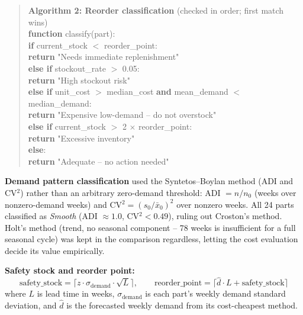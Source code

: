 \documentclass[12pt]{article}
\begin{document}
\begin{quote}
\footnotesize\ttfamily\noindent
\textbf{Algorithm 2: Reorder classification} (checked in order; first match wins)\\[0.3em]
\textbf{function} classify(part):\\
\hspace*{1.5em}\textbf{if} current\_stock $<$ reorder\_point:\\
\hspace*{3em}\textbf{return} "Needs immediate replenishment"\\
\hspace*{1.5em}\textbf{else if} stockout\_rate $>$ 0.05:\\
\hspace*{3em}\textbf{return} "High stockout risk"\\
\hspace*{1.5em}\textbf{else if} unit\_cost $>$ median\_cost \textbf{and} mean\_demand $<$ median\_demand:\\
\hspace*{3em}\textbf{return} "Expensive low-demand -- do not overstock"\\
\hspace*{1.5em}\textbf{else if} current\_stock $>$ 2 $\times$ reorder\_point:\\
\hspace*{3em}\textbf{return} "Excessive inventory"\\
\hspace*{1.5em}\textbf{else}:\\
\hspace*{3em}\textbf{return} "Adequate -- no action needed"
\end{quote}

\textbf{Demand pattern classification} used the Syntetos--Boylan method (ADI and CV$^2$)
rather than an arbitrary zero-demand threshold: ADI $= n / n_0$ (weeks over nonzero-demand
weeks) and CV$^2 = (s_0/\bar{x}_0)^2$ over nonzero weeks. All 24 parts classified as
\emph{Smooth} (ADI $\approx 1.0$, CV$^2 < 0.49$), ruling out Croston's method. Holt's method
(trend, no seasonal component -- 78 weeks is insufficient for a full seasonal cycle) was kept
in the comparison regardless, letting the cost evaluation decide its value empirically.

\textbf{Safety stock and reorder point:}
\[
\text{safety\_stock} = \lceil z \cdot \sigma_{\text{demand}} \cdot \sqrt{L} \rceil, \qquad
\text{reorder\_point} = \lceil \hat{d} \cdot L + \text{safety\_stock} \rceil
\]
where $L$ is lead time in weeks, $\sigma_{\text{demand}}$ is each part's weekly demand
standard deviation, and $\hat{d}$ is the forecasted weekly demand from its cost-cheapest
method.
\end{document}
